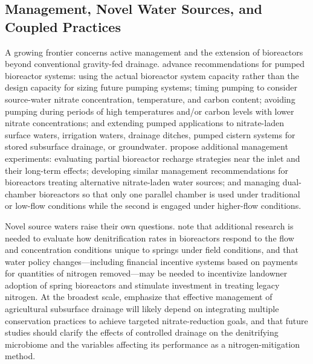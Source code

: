 \documentclass[11pt]{article}
\begin{document}
\subsection{Management, Novel Water Sources, and Coupled Practices}
A growing frontier concerns active management and the extension of bioreactors beyond conventional gravity-fed drainage. \textcite{Hartfiel2023} advance recommendations for pumped bioreactor systems: using the actual bioreactor system capacity rather than the design capacity for sizing future pumping systems; timing pumping to consider source-water nitrate concentration, temperature, and carbon content; avoiding pumping during periods of high temperatures and/or carbon levels with lower nitrate concentrations; and extending pumped applications to nitrate-laden surface waters, irrigation waters, drainage ditches, pumped cistern systems for stored subsurface drainage, or groundwater. \textcite{Hartfiel2023b} propose additional management experiments: evaluating partial bioreactor recharge strategies near the inlet and their long-term effects; developing similar management recommendations for bioreactors treating alternative nitrate-laden water sources; and managing dual-chamber bioreactors so that only one parallel chamber is used under traditional or low-flow conditions while the second is engaged under higher-flow conditions.

Novel source waters raise their own questions. \textcite{Easton2019} note that additional research is needed to evaluate how denitrification rates in bioreactors respond to the flow and concentration conditions unique to springs under field conditions, and that water policy changes---including financial incentive systems based on payments for quantities of nitrogen removed---may be needed to incentivize landowner adoption of spring bioreactors and stimulate investment in treating legacy nitrogen. At the broadest scale, \textcite{Wang2025b} emphasize that effective management of agricultural subsurface drainage will likely depend on integrating multiple conservation practices to achieve targeted nitrate-reduction goals, and that future studies should clarify the effects of controlled drainage on the denitrifying microbiome and the variables affecting its performance as a nitrogen-mitigation method.
\end{document}
